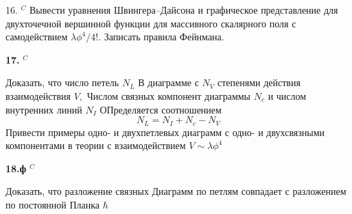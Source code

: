 \documentclass[a4paper,12pt]{article} %
\begin{document}
\begin{ttask}

16. $^{C}$ Вывести уравнения Швингера–Дайсона и графическое представление для двухточечной вершинной функции для массивного скалярного поля с самодействием $\lambda \phi^{4} / 4 ! .$ Записать правила Фейнмана.


\end{ttask}



\begin{ttask}\textbf{17. }$^{C}$ 

Доказать, что число петель $N_{L}$ В диаграмме с $N_{V}$ степенями действия взаимодействия $V,$ Числом связных компонент диаграммы $N_{c}$ и числом внутренних линий $N_{I}$ ОПределяется соотношением
$$
N_{L}=N_{I}+N_{c}-N_{V}
$$
Привести примеры одно- и двухпетлевых диаграмм с одно- и двухсвязными компонентами в теории с взаимодействием $V \sim \lambda \phi^{4}$


































\end{ttask}



\begin{ttask}\textbf{18.ф} $^{C}$ 
	
Доказать, что разложение связных Диаграмм по петлям совпадает с разложением по постоянной Планка $\hbar$



































\end{ttask}
\end{document}
